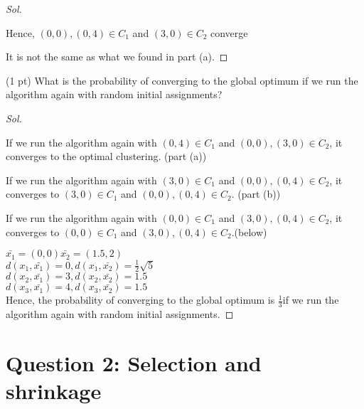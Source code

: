 \documentclass[11pt, oneside]{article}   	%
\newenvironment{Solution}[1][Sol]{%
  \begin{proof}[#1]$ $\par\nobreak\ignorespaces
	\qquad
}{%
  \end{proof}
}
\begin{document}
\begin{enumerate}[label = (\emph{\alph*})]
\begin{Solution}
            Hence, $(0,0),(0,4)\in C_{1}$ and  $(3,0)\in C_{2}$ converge
            
            It is not the same as what we found in part (a).




	      \end{Solution}
	\item (1 pt) What is the probability of converging to the global optimum if we run the algorithm again with random initial assignments?

	      \begin{Solution}
            
            \item  If we run the algorithm again with $(0,4)\in C_{1}$ and  $(0,0),(3,0)\in C_{2}$, it converges to the optimal clustering. (part (a))
            
            \item  If we run the algorithm again with $(3,0)\in C_{1}$ and  $(0,0),(0,4)\in C_{2}$, it converges to $(3,0)\in C_{1}$ and  $(0,0),(0,4)\in C_{2}$. (part (b))
            
            \item  If we run the algorithm again with $(0,0)\in C_{1}$ and  $(3,0),(0,4)\in C_{2}$, it converges to $(0,0)\in C_{1}$ and  $(3,0),(0,4)\in C_{2}$.(below)
            
            $\bar{x_{1}}=(0,0)\bar{x_{2}}=(1.5,2)$\\
            
            $d(x_{1},\bar{x_{1}})=0, d(x_{1},\bar{x_{2}})=\frac{1}{2}\sqrt{5}$\\
            $d(x_{2},\bar{x_{1}})=3, d(x_{2},\bar{x_{2}})=1.5$\\
            $d(x_{3},\bar{x_{1}})=4, d(x_{3},\bar{x_{2}})=1.5$\\
            
            Hence, the probability of converging to the global optimum is $\frac{1}{3}$if we run the algorithm again with random initial assignments.
            
            
            
            
            
	      \end{Solution}
\end{enumerate}


\newpage

\section*{Question 2: Selection and shrinkage}
\end{document}
